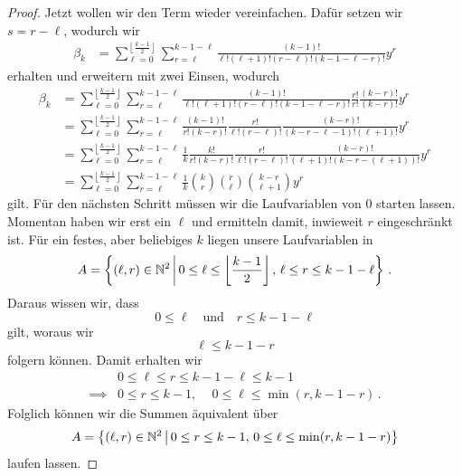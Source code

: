 \documentclass[../Bachelor_LennartKoliwer.tex]{subfiles}
\begin{document}
\begin{proof}
    Jetzt wollen wir den Term wieder vereinfachen. Dafür setzen wir $s=r-\ell$, wodurch wir
    \begin{align*}
        \beta_k &= \sum_{\ell=0}^{\left\lfloor\frac{k-1}{2}\right\rfloor}\sum_{r=\ell}^{k-1-\ell} \frac{(k-1)!}{\ell!(\ell+1)!(r-\ell)!(k-1-\ell-r)!}y^{r}
    \end{align*}
    erhalten und erweitern mit zwei Einsen, wodurch
    \begin{align*}
        \beta_k &= \sum_{\ell=0}^{\left\lfloor\frac{k-1}{2}\right\rfloor}\sum_{r=\ell}^{k-1-\ell} \frac{(k-1)!}{\ell!(\ell+1)!(r-\ell)!(k-1-\ell-r)!} \frac{r!}{r!}\frac{(k-r)!}{(k-r)!}y^{r} 
        \\
        &= \sum_{\ell=0}^{\left\lfloor\frac{k-1}{2}\right\rfloor}\sum_{r=\ell}^{k-1-\ell} \frac{(k-1)!}{r!(k-r)!} \frac{r!}{\ell!(r-\ell)!} \frac{(k-r)!}{(k-r-\ell-1)!(\ell+1)!} y^{r} 
        \\
        &= \sum_{\ell=0}^{\left\lfloor\frac{k-1}{2}\right\rfloor}\sum_{r=\ell}^{k-1-\ell} \frac1k\frac{k!}{r!(k-r)!} \frac{r!}{\ell!(r-\ell)!} \frac{(k-r)!}{(\ell+1)!(k-r-(\ell+1))!} y^{r} 
        \\
        &= \sum_{\ell=0}^{\left\lfloor\frac{k-1}{2}\right\rfloor}\sum_{r=\ell}^{k-1-\ell} \frac1k\binom{k}{r} \binom{r}{\ell} \binom{k-r}{\ell+1} y^{r}
    \end{align*}
    gilt.
    Für den nächsten Schritt müssen wir die Laufvariablen von $0$ starten lassen. 
    Momentan haben wir erst ein $\ell$ und ermitteln damit, inwieweit $r$ eingeschränkt ist. 
    Für ein festes, aber beliebiges $k$ liegen unsere Laufvariablen in
    \begin{align*}
        A = \left\{(\ell,r)\in\mathbb{N}^2 \,\middle|\, 0\leq \ell \leq \left\lfloor\frac{k-1}{2}\right\rfloor,\, \ell\leq r \leq k-1-\ell\right\}\,.
    \end{align*}
    Daraus wissen wir, dass 
    \[
        0\leq \ell\quad\text{und}\quad r\leq k-1-\ell
    \] 
    gilt, woraus wir 
    \[
        \ell\leq k-1-r
    \]
    folgern können. 
    Damit erhalten wir 
    \begin{align*}
                    &0\leq \ell\leq r \leq k-1-\ell\leq k-1 \\
        \implies    &0\leq r\leq k-1,\,\quad 0\leq \ell\leq\min(r,k-1-r)\,.
    \end{align*} 
    Folglich können wir die Summen äquivalent über 
    \begin{align}
        A = \left\{(\ell,r)\in\mathbb{N}^2 \,\middle|\, 0\leq r\leq k-1,\, 0\leq \ell\leq\min(r,k-1-r)\right\} \label{eq:laufvar}
    \end{align}
    laufen lassen.


\end{proof}
\end{document}
